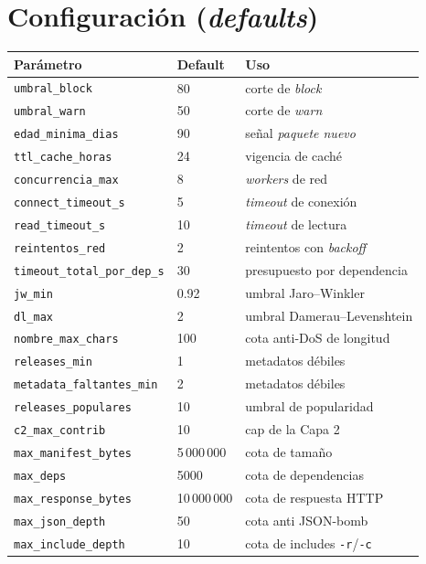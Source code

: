 \documentclass[11pt,a4paper]{article}
\begin{document}
\section{Configuración (\emph{defaults})}

\begin{center}
\small
\begin{longtable}{@{}lll@{}}
\toprule
\textbf{Parámetro} & \textbf{Default} & \textbf{Uso} \\
\midrule
\endhead
\texttt{umbral_block} & 80 & corte de \emph{block} \\
\texttt{umbral_warn} & 50 & corte de \emph{warn} \\
\texttt{edad_minima_dias} & 90 & señal \emph{paquete nuevo} \\
\texttt{ttl_cache_horas} & 24 & vigencia de caché \\
\texttt{concurrencia_max} & 8 & \emph{workers} de red \\
\texttt{connect_timeout_s} & 5 & \emph{timeout} de conexión \\
\texttt{read_timeout_s} & 10 & \emph{timeout} de lectura \\
\texttt{reintentos_red} & 2 & reintentos con \emph{backoff} \\
\texttt{timeout_total_por_dep_s} & 30 & presupuesto por dependencia \\
\texttt{jw_min} & 0.92 & umbral Jaro--Winkler \\
\texttt{dl_max} & 2 & umbral Damerau--Levenshtein \\
\texttt{nombre_max_chars} & 100 & cota anti-DoS de longitud \\
\texttt{releases_min} & 1 & metadatos débiles \\
\texttt{metadata_faltantes_min} & 2 & metadatos débiles \\
\texttt{releases_populares} & 10 & umbral de popularidad \\
\texttt{c2_max_contrib} & 10 & cap de la Capa 2 \\
\texttt{max_manifest_bytes} & 5\,000\,000 & cota de tamaño \\
\texttt{max_deps} & 5000 & cota de dependencias \\
\texttt{max_response_bytes} & 10\,000\,000 & cota de respuesta HTTP \\
\texttt{max_json_depth} & 50 & cota anti JSON-bomb \\
\texttt{max_include_depth} & 10 & cota de includes \texttt{-r}/\texttt{-c} \\
\bottomrule
\end{longtable}
\end{center}
\end{document}
